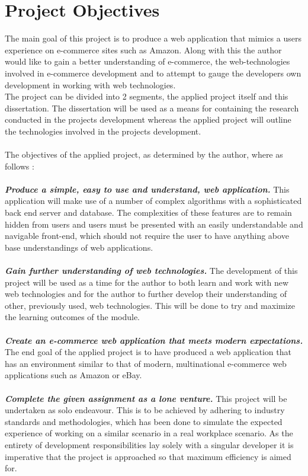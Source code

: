 \section{Project Objectives} 
The main goal of this project is to produce a web application that mimics a users experience on e-commerce sites such as Amazon. Along with this the author would like to gain a better understanding of e-commerce, the web-technologies involved in e-commerce development and to attempt to gauge the developers own development in working with web technologies. \\
The project can be divided into 2 segments, the applied project itself and this  dissertation. The dissertation will be used as a means for containing the research conducted in the projects development whereas the applied project will outline the technologies involved in the projects development. \\ \\
The objectives of the applied project, as determined by the author, where as follows : \\ \\
\textbf{\emph{Produce a simple, easy to use and understand, web application.}} This application will make use of a number of complex algorithms with a sophisticated back end server and database. The complexities of these features are to remain hidden from users and users must be presented with an easily understandable and navigable front-end, which should not require the user to have anything above base understandings of web applications. \\ \\
\textbf{\emph{Gain further understanding of web technologies.}} The development of this project will be used as a time for the author to both learn and work with new web technologies and for the author to further develop their understanding of other, previously used, web technologies. This will be done to try and maximize the learning outcomes of the module. \\  \\
\textbf{\emph{Create an e-commerce web application that meets modern expectations.}} The end goal of the applied project is to have produced a web application that has an environment similar to that of modern, multinational e-commerce web applications such as Amazon or eBay. \\  \\
\textbf{\emph{Complete the given assignment as a lone venture.}} This project will be undertaken as solo endeavour. This is to be achieved by adhering to industry standards and methodologies, which has been done to simulate the expected experience of working on a similar scenario in a real workplace scenario. As the entirety of development responsibilities lay solely with a singular developer it is imperative that the project is approached so that maximum efficiency is aimed for. \\ \\
\newpage

